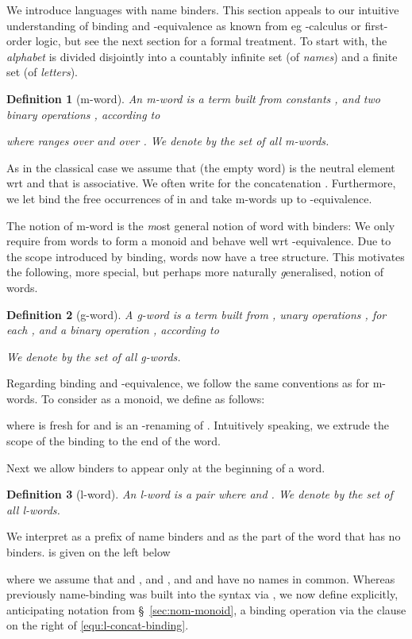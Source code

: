 \documentclass[runningheads,a4paper]{llncs}
\newtheorem{definition}{Theorem}[section]
\newtheorem{definition}{Definition}[section]
\begin{document}
We introduce languages with name binders. This section appeals to our
intuitive understanding of binding and -equivalence as known
from eg -calculus or first-order logic, but see the next
section for a formal treatment.
To start with, the \emph{alphabet} is divided disjointly into a
countably infinite set  (of \emph{names}) and a finite set
 (of \emph{letters}).

\begin{definition}[m-word]
  An \emph{m-word} is a term built from constants
  , and two binary operations
  , according to

where  ranges over  and  over . We denote by
 the set of all m-words.
\end{definition}
As in the classical case we assume that  (the empty word)
is the neutral element wrt  and that  is associative. We
often write  for the concatenation . Furthermore, we let
 bind the free occurrences of  in  and take
m-words up to -equivalence.

The notion of m-word is the \emph{m}ost general notion of word with
binders: We only require from words to form a monoid and behave well
wrt -equivalence. Due to the scope introduced by binding,
words now have a tree structure. This motivates the following, more
special, but perhaps more naturally \emph{g}eneralised, notion of
words.
\begin{definition}[g-word]
  A \emph{g-word} is a term built from , unary operations
  ,  for each , and a binary operation
  , according to

We denote by  the set of all g-words.
\end{definition}
Regarding binding and -equivalence, we follow the same
conventions as for m-words. To consider  as a monoid, we
define  as
follows:

where  is fresh for  and  is an
-renaming of .
Intuitively speaking, we extrude the scope of the binding to the end
of the word.

Next we allow binders to appear only at the beginning of a word.
\begin{definition}[l-word]
  An \emph{l-word} is a pair  where  and
  . We denote by  the set
  of all l-words.
\end{definition}
We interpret  as a prefix of name binders and  as the part of
the word that has no binders.
 is given
on the left below 

where we assume that  and ,  and , and  and  have no
names in common.
Whereas previously name-binding was built into the syntax via , we now define explicitly, anticipating notation from
\S~\ref{sec:nom-monoid}, a binding operation  via the clause on the right of
\eqref{equ:l-concat-binding}.
\end{document}
